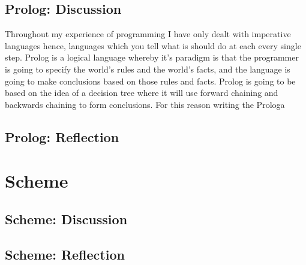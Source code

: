 \documentclass[
	12pt, %
]{fphw}
\begin{document}
\subsection{Prolog: Discussion}
Throughout my experience of programming I have only dealt with imperative languages
hence, languages which you tell what is should do at each every single step.
Prolog is a logical language whereby it's paradigm is that the programmer is
going to specify the world's rules and the world's facts, and the language is
going to make conclusions based on those rules and facts. Prolog is going to be
based on the idea of a decision tree where it will use forward chaining and
backwards chaining to form conclusions. For this reason writing the Prologa


\subsection{Prolog: Reflection}

\section{Scheme}

\subsection{Scheme: Discussion}

\subsection{Scheme: Reflection}
\end{document}
